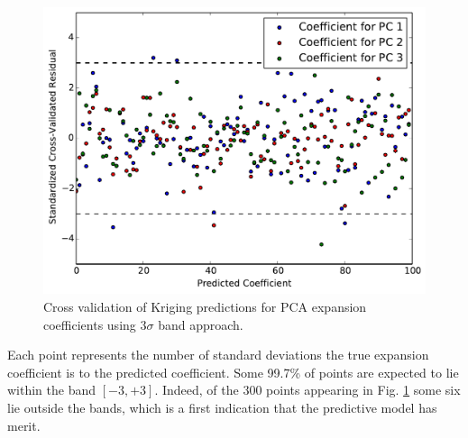 \begin{figure}
\caption{\label{fig:xval_3sig_bands}
Cross validation of Kriging predictions for \ac{PCA} expansion coefficients using 3$\sigma$ band approach.}
 \begin{center}
  \includegraphics[scale=.75]{./Chapter4/xval_3sig_band.pdf}
 \end{center}
\end{figure}
Each point represents the number of standard deviations the true expansion coefficient is to the predicted coefficient. Some 99.7\% of points are expected to lie within the band $\left[-3, +3\right]$. Indeed, of the 300 points appearing in Fig. \ref{fig:xval_3sig_bands} some six lie outside the bands, which is a first indication that the predictive model has merit.  

